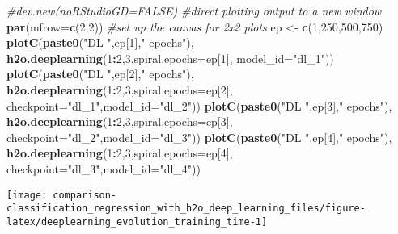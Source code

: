 \documentclass[]{book}
\newenvironment{Shaded}{\begin{snugshade}}{\end{snugshade}}
\newcommand{\CommentTok}[1]{\textcolor[rgb]{0.56,0.35,0.01}{\textit{#1}}}
\newcommand{\DataTypeTok}[1]{\textcolor[rgb]{0.13,0.29,0.53}{#1}}
\newcommand{\DecValTok}[1]{\textcolor[rgb]{0.00,0.00,0.81}{#1}}
\newcommand{\KeywordTok}[1]{\textcolor[rgb]{0.13,0.29,0.53}{\textbf{#1}}}
\newcommand{\NormalTok}[1]{#1}
\newcommand{\OperatorTok}[1]{\textcolor[rgb]{0.81,0.36,0.00}{\textbf{#1}}}
\newcommand{\StringTok}[1]{\textcolor[rgb]{0.31,0.60,0.02}{#1}}
\begin{document}
\begin{Shaded}
\begin{Highlighting}[]
\CommentTok{#dev.new(noRStudioGD=FALSE) #direct plotting output to a new window}
\KeywordTok{par}\NormalTok{(}\DataTypeTok{mfrow=}\KeywordTok{c}\NormalTok{(}\DecValTok{2}\NormalTok{,}\DecValTok{2}\NormalTok{)) }\CommentTok{#set up the canvas for 2x2 plots}
\NormalTok{ep <-}\StringTok{ }\KeywordTok{c}\NormalTok{(}\DecValTok{1}\NormalTok{,}\DecValTok{250}\NormalTok{,}\DecValTok{500}\NormalTok{,}\DecValTok{750}\NormalTok{)}
\KeywordTok{plotC}\NormalTok{(}\KeywordTok{paste0}\NormalTok{(}\StringTok{"DL "}\NormalTok{,ep[}\DecValTok{1}\NormalTok{],}\StringTok{" epochs"}\NormalTok{),}
      \KeywordTok{h2o.deeplearning}\NormalTok{(}\DecValTok{1}\OperatorTok{:}\DecValTok{2}\NormalTok{,}\DecValTok{3}\NormalTok{,spiral,}\DataTypeTok{epochs=}\NormalTok{ep[}\DecValTok{1}\NormalTok{],}
                              \DataTypeTok{model_id=}\StringTok{"dl_1"}\NormalTok{))}
\KeywordTok{plotC}\NormalTok{(}\KeywordTok{paste0}\NormalTok{(}\StringTok{"DL "}\NormalTok{,ep[}\DecValTok{2}\NormalTok{],}\StringTok{" epochs"}\NormalTok{),}
      \KeywordTok{h2o.deeplearning}\NormalTok{(}\DecValTok{1}\OperatorTok{:}\DecValTok{2}\NormalTok{,}\DecValTok{3}\NormalTok{,spiral,}\DataTypeTok{epochs=}\NormalTok{ep[}\DecValTok{2}\NormalTok{],}
            \DataTypeTok{checkpoint=}\StringTok{"dl_1"}\NormalTok{,}\DataTypeTok{model_id=}\StringTok{"dl_2"}\NormalTok{))}
\KeywordTok{plotC}\NormalTok{(}\KeywordTok{paste0}\NormalTok{(}\StringTok{"DL "}\NormalTok{,ep[}\DecValTok{3}\NormalTok{],}\StringTok{" epochs"}\NormalTok{),}
      \KeywordTok{h2o.deeplearning}\NormalTok{(}\DecValTok{1}\OperatorTok{:}\DecValTok{2}\NormalTok{,}\DecValTok{3}\NormalTok{,spiral,}\DataTypeTok{epochs=}\NormalTok{ep[}\DecValTok{3}\NormalTok{],}
            \DataTypeTok{checkpoint=}\StringTok{"dl_2"}\NormalTok{,}\DataTypeTok{model_id=}\StringTok{"dl_3"}\NormalTok{))}
\KeywordTok{plotC}\NormalTok{(}\KeywordTok{paste0}\NormalTok{(}\StringTok{"DL "}\NormalTok{,ep[}\DecValTok{4}\NormalTok{],}\StringTok{" epochs"}\NormalTok{),}
      \KeywordTok{h2o.deeplearning}\NormalTok{(}\DecValTok{1}\OperatorTok{:}\DecValTok{2}\NormalTok{,}\DecValTok{3}\NormalTok{,spiral,}\DataTypeTok{epochs=}\NormalTok{ep[}\DecValTok{4}\NormalTok{],}
            \DataTypeTok{checkpoint=}\StringTok{"dl_3"}\NormalTok{,}\DataTypeTok{model_id=}\StringTok{"dl_4"}\NormalTok{))}
\end{Highlighting}
\end{Shaded}

\begin{center}\texttt{[image: comparison-classification\_regression\_with\_h2o\_deep\_learning\_files/figure-latex/deeplearning\_evolution\_training\_time-1]} \end{center}
\end{document}
